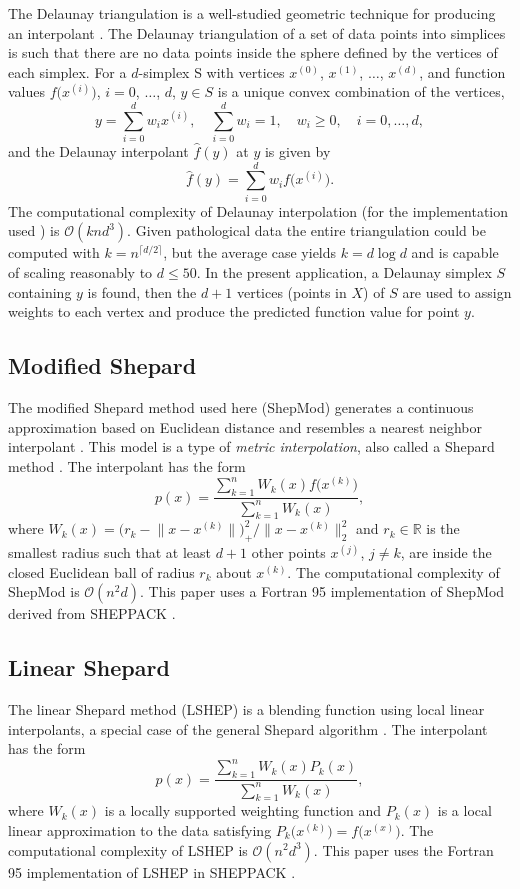 \documentclass[smallextended,final]{svjour3}  %
\begin{document}
The Delaunay triangulation is a well-studied geometric technique for
producing an interpolant \cite{lee1980two}. The Delaunay triangulation
of a set of data points into simplices is such that there are no data
points inside the sphere defined by the vertices of each simplex. For
a $d$-simplex S with vertices $x^{(0)}$, $x^{(1)}$, $\ldots$,
$x^{(d)}$, and function values $f\bigl(x^{(i)}\bigr)$, $i=0$,
$\ldots$, $d$, $y \in S$ is a unique convex combination of the
vertices,
 $$ y = \sum_{i=0}^{d} w_i x^{(i)}, \quad \sum_{i=0}^{d} w_i = 1, \quad w_i \geq 0, \quad i=0,\ldots,d, $$
and the Delaunay interpolant $\hat f(y)$ at $y$ is given by
 $$ \hat f(y) = \sum_{i=0}^{d} w_i f\bigl(x^{(i)}\bigr). $$ The
computational complexity of Delaunay interpolation (for the
implementation used \cite{chang2018polynomial}) is $\mathcal{O}(k n
d^3)$. Given pathological data the entire triangulation could be
computed with $k = n^{\lceil d / 2 \rceil}$, but the average case yields
$k = d \log d$ and is capable of scaling reasonably to $d \leq 50$. In
the present application, a Delaunay simplex $S$ containing $y$ is
found, then the $d+1$ vertices (points in $X$) of $S$ are used to
assign weights to each vertex and produce the predicted function value
for point $y$.

\subsection{Modified Shepard}
\label{sec:modified-shepard}

The modified Shepard method used here (ShepMod) generates a continuous
approximation based on Euclidean distance and resembles a nearest
neighbor interpolant \cite{cover1967nearest}. This model is a type of
\textit{metric interpolation}, also called a Shepard method
\cite{shepard1968two,gordon1978shepard}. The interpolant has the form
 $$ p(x) = \frac{\sum\limits_{k=1}^{n}W_k(x)f\bigl(x^{(k)}\bigr)}
     {\sum\limits_{k=1}^{n}W_k(x)} ,$$
where $W_k(x) = \bigl(r_k - \bigl\|x - x^{(k)}\bigr\|\bigr)_+^2 \big/
\bigl\|x - x^{(k)}\bigr\|_2^2$ and $r_k \in \mathbb{R}$ is the
smallest radius such that at least $d+1$ other points $x^{(j)}$, $j
\not = k$, are inside the closed Euclidean ball of radius $r_k$ about
$x^{(k)}$. The computational complexity of ShepMod is
$\mathcal{O}(n^2d)$. This paper uses a Fortran 95 implementation of
ShepMod derived from SHEPPACK \cite{thacker2010algorithm}.

\subsection{Linear Shepard}
The linear Shepard method (LSHEP) is a blending function using local
linear interpolants, a special case of the general Shepard algorithm
\cite{thacker2010algorithm}. The interpolant has the form
 $$ p(x) = \frac{\sum\limits_{k=1}^{n}W_k(x)P_k(x)}
 {\sum\limits_{k=1}^{n}W_k(x)} ,$$
where $W_k(x)$ is a locally supported weighting function and $P_k(x)$
is a local linear approximation to the data satisfying
$P_k\bigl(x^{(k)}\bigr) = f\bigl(x^{(x)}\bigr)$. The computational
complexity of LSHEP is $\mathcal{O}(n^2d^3)$. This paper uses the
Fortran 95 implementation of LSHEP in SHEPPACK
\cite{thacker2010algorithm}.
\end{document}
